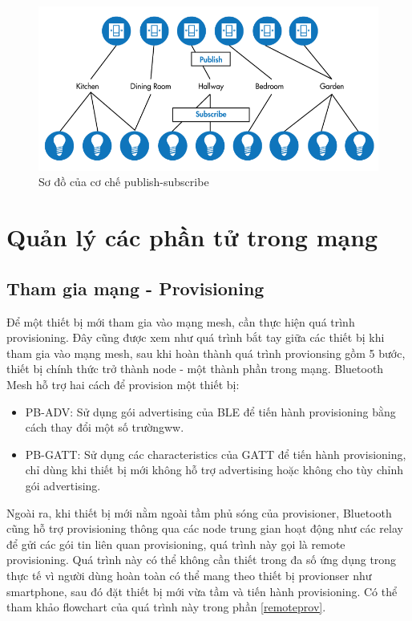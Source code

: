            \begin{figure}[h!]
        	    \begin{center}
        		    \includegraphics[scale=0.5]{images/mesh-pub-sub.png}
        		    \caption{Sơ đồ của cơ chế publish-subscribe}
        	    \end{center}
            \end{figure}
    \section{Quản lý các phần tử trong mạng}
        \subsection{Tham gia mạng - Provisioning}
            Để một thiết bị mới tham gia vào mạng mesh, cần thực hiện quá trình provisioning. Đây cũng được xem như quá trình bắt tay giữa các thiết bị khi tham gia vào mạng mesh, sau khi hoàn thành quá trình provionsing gồm 5 bước, thiết bị chính thức trở thành node - một thành phần trong mạng. Bluetooth Mesh hỗ trợ hai cách để provision một thiết bị:
            \begin{itemize}
                \item PB-ADV: Sử dụng gói advertising của BLE để tiến hành provisioning bằng cách thay đổi một số trườngww.
                \item PB-GATT: Sử dụng các characteristics của GATT để tiến hành provisioning, chỉ dùng khi thiết bị mới không hỗ trợ advertising hoặc không cho tùy chỉnh gói advertising.
            \end{itemize}

            Ngoài ra, khi thiết bị mới nằm ngoài tầm phủ sóng của provisioner, Bluetooth cũng hỗ trợ provisioning thông qua các node trung gian hoạt động như các relay để gửi các gói tin liên quan provisioning, quá trình này gọi là remote provisioning. Quá trình này có thể không cần thiết trong đa số ứng dụng trong thực tế vì người dùng hoàn toàn có thể mang theo thiết bị provionser như smartphone, sau đó đặt thiết bị mới vừa tầm và tiến hành provisioning. Có thể tham khảo flowchart của quá trình này trong phần \ref{remoteprov}.


